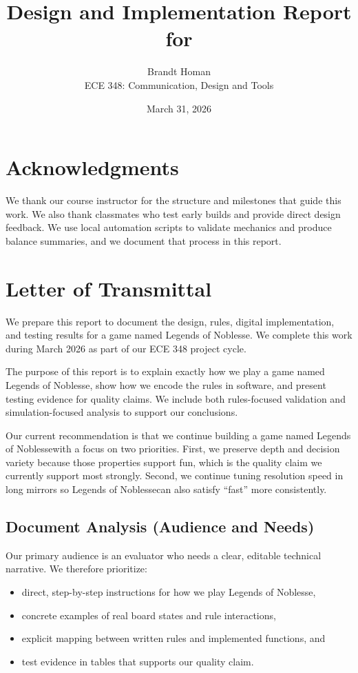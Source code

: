\documentclass[12pt]{article}
\title{Design and Implementation Report for \NamedGame}
\author{Brandt Homan \\ \large ECE 348: Communication, Design and Tools}
\date{March 31, 2026}
\newcommand{\GameName}{Legends of Noblesse}
\newcommand{\NamedGame}{a game named Legends of Noblesse}
\begin{document}
\maketitle
\thispagestyle{empty}
\newpage

\section*{Acknowledgments}
We thank our course instructor for the structure and milestones that guide this work. We also thank classmates who test early builds and provide direct design feedback. We use local automation scripts to validate mechanics and produce balance summaries, and we document that process in this report.

\newpage

\section*{Letter of Transmittal}
We prepare this report to document the design, rules, digital implementation, and testing results for \NamedGame. We complete this work during March 2026 as part of our ECE 348 project cycle.

The purpose of this report is to explain exactly how we play \NamedGame, show how we encode the rules in software, and present testing evidence for quality claims. We include both rules-focused validation and simulation-focused analysis to support our conclusions.

Our current recommendation is that we continue building \NamedGame with a focus on two priorities. First, we preserve depth and decision variety because those properties support fun, which is the quality claim we currently support most strongly. Second, we continue tuning resolution speed in long mirrors so \GameName can also satisfy ``fast'' more consistently.

\subsection*{Document Analysis (Audience and Needs)}
Our primary audience is an evaluator who needs a clear, editable technical narrative. We therefore prioritize:
\begin{itemize}
    \item direct, step-by-step instructions for how we play \GameName,
    \item concrete examples of real board states and rule interactions,
    \item explicit mapping between written rules and implemented functions, and
    \item test evidence in tables that supports our quality claim.
\end{itemize}
\end{document}

